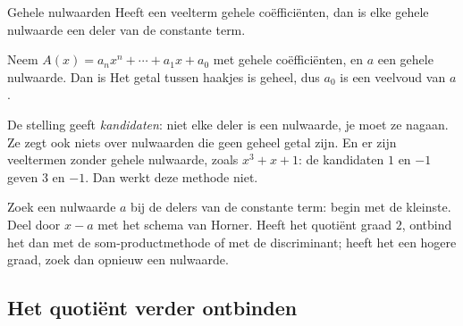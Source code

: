 \begin{theorie}
\begin{stelling}{Gehele nulwaarden}
Heeft een veelterm gehele coëfficiënten, dan is elke gehele nulwaarde een deler van de constante term.
\end{stelling}
\begin{bewijs}
Neem $A(x) = a_nx^n + \cdots + a_1x + a_0$ met gehele coëfficiënten, en $a$ een gehele nulwaarde. Dan is
Het getal tussen haakjes is geheel, dus $a_0$ is een veelvoud van $a$.
\end{bewijs}
\end{theorie}

De stelling geeft \textit{kandidaten}: niet elke deler is een nulwaarde, je moet ze nagaan. Ze zegt ook niets over nulwaarden die geen geheel getal zijn. En er zijn veeltermen zonder gehele nulwaarde, zoals $x^3 + x + 1$: de kandidaten $1$ en $-1$ geven $3$ en $-1$. Dan werkt deze methode niet.


\begin{werkwijze}
Zoek een nulwaarde $a$ bij de delers van de constante term: begin met de kleinste. Deel door $x - a$ met het schema van Horner. Heeft het quotiënt graad $2$, ontbind het dan met de som-productmethode of met de discriminant; heeft het een hogere graad, zoek dan opnieuw een nulwaarde.
\end{werkwijze}

\begin{oefeningen}
\end{oefeningen}

\subsection{Het quotiënt verder ontbinden}

